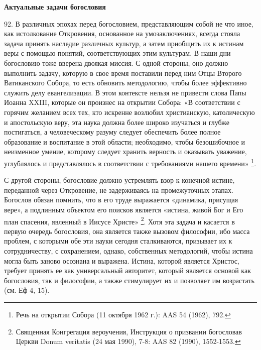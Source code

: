 \documentclass[a5paper,10pt]{article}
\begin{document}
\textbf{Актуальные задачи богословия}

92. В различных эпохах перед богословием, представляющим собой не что иное, как
истолкование Откровения, основанное на умозаключениях, всегда стояла задача
принять наследие различных культур, а затем приобщить их к истинам веры с
помощью понятий, соответствующих этим культурам. В наши дни богословию тоже
вверена двоякая миссия. С одной стороны, оно должно выполнить задачу, которую в
свое время поставили перед ним Отцы Второго Ватиканского Собора, то есть
обновить методологию, чтобы более эффективно служить делу евангелизации. В этом
контексте нельзя не привести слова Папы Иоанна XXIII, которые он произнес на
открытии Собора: «В соответствии с горячим желанием всех тех, кто искренне
возлюбил христианскую, католическую и апостольскую веру, эта наука должна более
широко изучаться и глубже постигаться, а человеческому разуму следует
обеспечить более полное образование и воспитание в этой области; необходимо,
чтобы безошибочное и неизменное умение, которому следует хранить верность и
оказывать уважение, углублялось и представлялось в соответствии с требованиями
нашего времени» \footnote{Речь на открытии Собора (11 октября 1962 г.): AAS 54
(1962), 792.}.

С другой стороны, богословие должно устремлять взор к конечной истине,
переданной через Откровение, не задерживаясь на промежуточных этапах. Богослов
обязан помнить, что в его труде выражается «динамика, присущая вере», а
подлинным объектом его поисков является «истина, живой Бог и Его план спасения,
явленный в Иисусе Христе» \footnote{Священная Конгрегация вероучения,
Инструкция о призвании богословав Церкви Donum veritatis (24 мая 1990), 7-8:
AAS 82 (1990), 1552-1553.}. Хотя эта задача и касается в первую очередь
богословия, она является также вызовом философии, ибо масса проблем, с которыми
обе эти науки сегодня сталкиваются, призывает их к сотрудничеству, с
сохранением, однако, собственных методологий, чтобы истина могла быть заново
осознана и выражена. Истина, которой является Христос, требует принять ее как
универсальный авторитет, который является основой как богословия, так и
философии, а также стимулирует их и позволяет им возрастать (см. Еф 4, 15).
\end{document}
